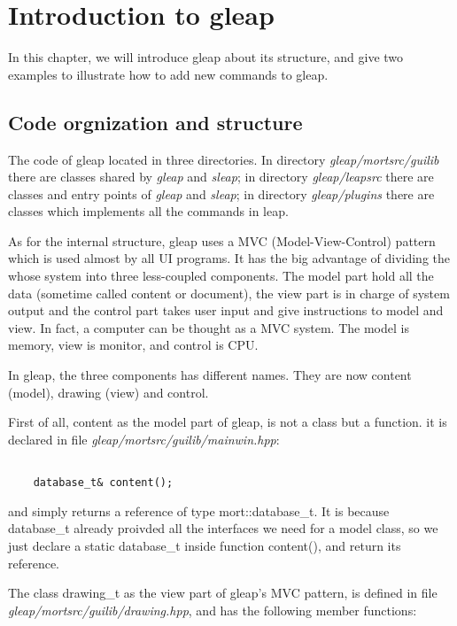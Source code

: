 \documentclass[letterpaper]{book}
\begin{document}
\chapter{Introduction to gleap}

  In this chapter, we will introduce gleap about its structure, and give two
examples to illustrate how to add new commands to gleap.

\section{Code orgnization and structure}

  The code of gleap located in three directories. In directory {\it gleap/mortsrc/guilib}
there are classes shared by {\it gleap} and {\it sleap}; in directory {\it gleap/leapsrc}
there are classes and entry points of {\it gleap} and {\it sleap}; in directory 
{\it gleap/plugins} there are classes which implements all the commands in leap.


  As for the internal structure, gleap uses a MVC (Model-View-Control) pattern which is 
used almost by all UI programs. It has the big advantage of dividing the whose system
into three less-coupled components. The model part hold all the data (sometime called 
content or document), the view part is in charge of system output and the control part
takes user input and give instructions to model and view. In fact, a computer can be
thought as a MVC system. The model is memory, view is monitor, and control is CPU.


  In gleap, the three components has different names. They are now content (model), 
drawing (view) and control.


  First of all, content as the model part of gleap, is not a class but a function.
it is declared in file {\it gleap/mortsrc/guilib/mainwin.hpp}:

\begin{lstlisting}

    database_t& content();

\end{lstlisting}

and simply returns a reference of type mort::database\_t. It is because database\_t
already proivded all the interfaces we need for a model class, so we just declare 
a static database\_t inside function content(), and return its reference.


The class drawing\_t as the view part of gleap's MVC pattern, is defined in file 
{\it gleap/mortsrc/guilib/drawing.hpp}, and has the following member functions:
\end{document}
